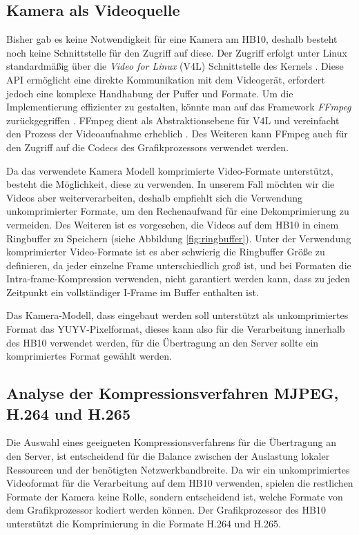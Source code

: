 \subsection{Kamera als Videoquelle} \label{sec:camera}

Bisher gab es keine Notwendigkeit für eine Kamera am HB10, deshalb besteht noch keine Schnittstelle für den Zugriff auf diese.
Der Zugriff erfolgt unter Linux standardmäßig über die \textit{Video for Linux} (V4L) Schnittstelle des Kernels \parencite{_2020_part}. Diese API ermöglicht eine direkte Kommunikation mit dem Videogerät, 
erfordert jedoch eine komplexe Handhabung der Puffer und Formate. Um die Implementierung effizienter zu gestalten, könnte man auf das Framework \textit{FFmpeg} zurückgegriffen \parencite{_2018_ffmpeg}. FFmpeg dient als Abstraktionsebene für V4L und 
vereinfacht den Prozess der Videoaufnahme erheblich \parencite{_documentation}. Des Weiteren kann FFmpeg auch für den Zugriff auf die Codecs des Grafikprozessors verwendet werden.\newline

Da das verwendete Kamera Modell komprimierte Video-Formate unterstützt, besteht die Möglichkeit, diese zu verwenden. In unserem Fall möchten wir die Videos aber weiterverarbeiten, 
deshalb empfiehlt sich die Verwendung unkomprimierter Formate, um den Rechenaufwand für eine Dekomprimierung zu vermeiden. Des Weiteren ist es vorgesehen, die Videos auf dem HB10 in einem Ringbuffer zu Speichern (siehe Abbildung \ref{fig:ringbuffer}). Unter der Verwendung komprimierter Video-Formate ist es aber schwierig die Ringbuffer Größe zu definieren,
da jeder einzelne Frame unterschiedlich groß ist, und bei Formaten die Intra-frame-Kompression verwenden, nicht garantiert werden kann, dass zu jeden Zeitpunkt ein vollständiger I-Frame im Buffer enthalten ist.\newline

Das Kamera-Modell, dass eingebaut werden soll unterstützt als unkomprimiertes Format das YUYV-Pixelformat, dieses kann also für die Verarbeitung innerhalb des HB10 verwendet werden, für die Übertragung an den Server sollte ein komprimiertes Format gewählt werden.

\subsection{Analyse der Kompressionsverfahren MJPEG, H.264 und H.265}

Die Auswahl eines geeigneten Kompressionsverfahrens für die Übertragung an den Server, ist entscheidend für die Balance zwischen der Auslastung lokaler Ressourcen und der benötigten Netzwerkbandbreite. Da wir ein unkomprimiertes Videoformat für die Verarbeitung auf dem HB10 verwenden, 
spielen die restlichen Formate der Kamera keine Rolle, sondern entscheidend ist, welche Formate von dem Grafikprozessor kodiert werden können. Der Grafikprozessor des HB10 unterstützt die Komprimierung in die Formate H.264 und H.265.\newline

